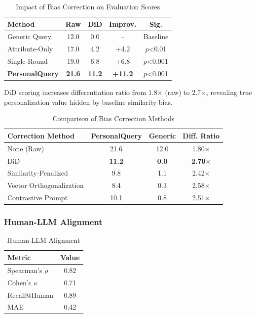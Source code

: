 \documentclass[11pt]{article}
\newcommand{\method}{PersonalQuery}
\begin{document}
\begin{table}[h]
\centering
\begin{tabular}{lcccc}
\toprule
\textbf{Method} & \textbf{Raw} & \textbf{DiD} & \textbf{Improv.} & \textbf{Sig.} \\
\midrule
Generic Query & 12.0 & 0.0 & -- & Baseline \\
Attribute-Only & 17.0 & 4.2 & +4.2 & $p$<0.01 \\
Single-Round & 19.0 & 6.8 & +6.8 & $p$<0.001 \\
\midrule
\textbf{\method{}} & \textbf{21.6} & \textbf{11.2} & \textbf{+11.2} & $p$<0.001 \\
\bottomrule
\end{tabular}
\caption{Impact of Bias Correction on Evaluation Scores}
\label{tab:bias}
\end{table}

DiD scoring increases differentiation ratio from 1.8$\times$ (raw) to 2.7$\times$, revealing true personalization value hidden by baseline similarity bias.

\begin{table}[h]
\centering
\begin{tabular}{lccc}
\toprule
\textbf{Correction Method} & \textbf{PersonalQuery} & \textbf{Generic} & \textbf{Diff. Ratio} \\
\midrule
None (Raw) & 21.6 & 12.0 & 1.80$\times$ \\
DiD & \textbf{11.2} & \textbf{0.0} & \textbf{2.70$\times$} \\
Similarity-Penalized & 9.8 & 1.1 & 2.42$\times$ \\
Vector Orthogonalization & 8.4 & 0.3 & 2.58$\times$ \\
Contrastive Prompt & 10.1 & 0.8 & 2.51$\times$ \\
\bottomrule
\end{tabular}
\caption{Comparison of Bias Correction Methods}
\label{tab:bias_methods}
\end{table}

\subsubsection{Human-LLM Alignment}

\begin{table}[h]
\centering
\begin{tabular}{lc}
\toprule
\textbf{Metric} & \textbf{Value} \\
\midrule
Spearman's $\rho$ & 0.82 \\
Cohen's $\kappa$ & 0.71 \\
Recall@Human & 0.89 \\
MAE & 0.42 \\
\bottomrule
\end{tabular}
\caption{Human-LLM Alignment}
\label{tab:alignment}
\end{table}
\end{document}
